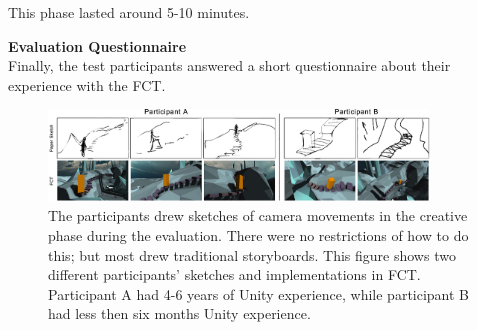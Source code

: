 This phase lasted around 5-10 minutes.

\textbf{Evaluation Questionnaire}\\
Finally, the test participants answered a short questionnaire about their experience with the FCT.

\begin{figure}[htbp]
\centering
\includegraphics[width=0.9\textwidth]{Pics/Sketching_FramingsNew}
\caption{The participants drew sketches of camera movements in the creative phase during the evaluation. There were no restrictions of how to do this; but most drew traditional storyboards. This figure shows two different participants' sketches and implementations in FCT. Participant A had 4-6 years of Unity experience, while participant B had less then six months Unity experience.}
\label{fig:Sketching_Framings}
\end{figure}